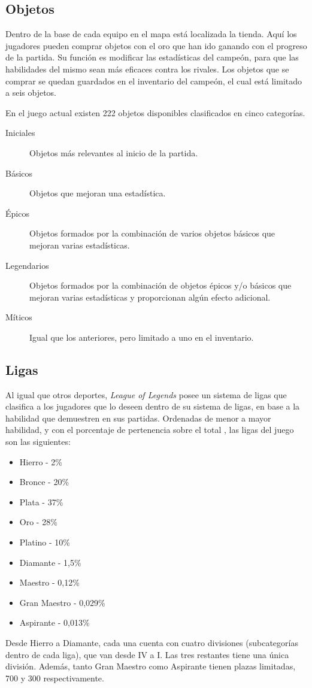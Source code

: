 \subsection{Objetos}
\label{objetos}
Dentro de la base de cada equipo en el mapa está localizada la tienda. Aquí los jugadores pueden comprar objetos con el oro que han ido ganando con el progreso de la partida. Su función es modificar las estadísticas del campeón, para que las habilidades del mismo sean más eficaces contra los rivales. Los objetos que se comprar se quedan guardados en el inventario del campeón, el cual está limitado a seis objetos.

En el juego actual existen 222 objetos disponibles clasificados en cinco categorías.
\begin{description}
	\item[Iniciales] Objetos más relevantes al inicio de la partida.
	\item[Básicos] Objetos que mejoran una estadística.
	\item[Épicos] Objetos formados por la combinación de varios objetos básicos que mejoran varias estadísticas.
	\item[Legendarios] Objetos formados por la combinación de objetos épicos y/o básicos que mejoran varias estadísticas y proporcionan algún efecto adicional.
	\item[Míticos] Igual que los anteriores, pero limitado a uno en el inventario.
\end{description}

\subsection{Ligas}
Al igual que otros deportes, \textit{League of Legends} posee un sistema de ligas que clasifica a los jugadores que lo deseen dentro de su sistema de ligas, en base a la habilidad que demuestren en sus partidas. Ordenadas de menor a mayor habilidad, y con el porcentaje de pertenencia sobre el total \cite{misc:player-distribution}, las ligas del juego son las siguientes:
\begin{itemize}
	\tightlist
	\item Hierro - 2\%
	\item Bronce - 20\%
	\item Plata - 37\%
	\item Oro - 28\%
	\item Platino - 10\%
	\item Diamante - 1,5\%
	\item Maestro - 0,12\%
	\item Gran Maestro - 0,029\%
	\item Aspirante - 0,013\%
\end{itemize}
Desde Hierro a Diamante, cada una cuenta con cuatro divisiones (subcategorías dentro de cada liga), que van desde IV a I. Las tres restantes tiene una única división. Además, tanto Gran Maestro como Aspirante tienen plazas limitadas, 700 y 300 respectivamente.

